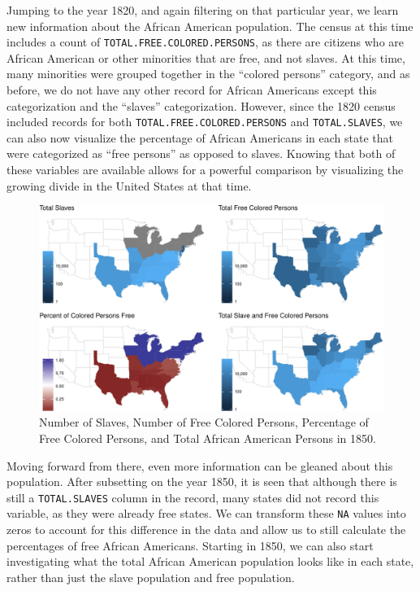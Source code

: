 \documentclass[11pt,]{article}
\begin{document}
Jumping to the year 1820, and again filtering on that particular year,
we learn new information about the African American population. The
census at this time includes a count of
\texttt{TOTAL.FREE.COLORED.PERSONS}, as there are citizens who are
African American or other minorities that are free, and not slaves. At
this time, many minorities were grouped together in the ``colored
persons'' category, and as before, we do not have any other record for
African Americans except this categorization and the ``slaves''
categorization. However, since the 1820 census included records for both
\texttt{TOTAL.FREE.COLORED.PERSONS} and \texttt{TOTAL.SLAVES}, we can
also now visualize the percentage of African Americans in each state
that were categorized as ``free persons'' as opposed to slaves. Knowing
that both of these variables are available allows for a powerful
comparison by visualizing the growing divide in the United States at
that time.

\begin{figure}[htbp]
\centering
\includegraphics{writeup_files/figure-latex/unnamed-chunk-6-1.pdf}
\caption{Number of Slaves, Number of Free Colored Persons, Percentage of
Free Colored Persons, and Total African American Persons in 1850.}
\end{figure}

Moving forward from there, even more information can be gleaned about
this population. After subsetting on the year 1850, it is seen that
although there is still a \texttt{TOTAL.SLAVES} column in the record,
many states did not record this variable, as they were already free
states. We can transform these \texttt{NA} values into zeros to account
for this difference in the data and allow us to still calculate the
percentages of free African Americans. Starting in 1850, we can also
start investigating what the total African American population looks
like in each state, rather than just the slave population and free
population.
\end{document}
